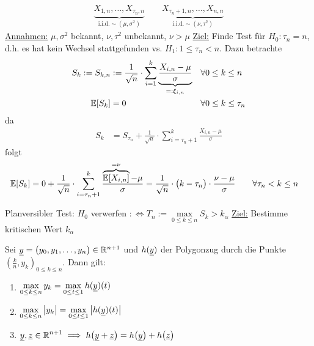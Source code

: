 \begin{align*}
\underbrace{X_{1,n},\ldots,X_{\tau_n,n}}_{\text{i.i.d.}\sim(\mu,\sigma^2)}\qquad\underbrace{X_{\tau_n+1,n},\ldots,X_{n,n}}_{\text{i.i.d.}\sim(\nu,\tau^2)}
\end{align*}
\underline{Annahmen:} $\mu,\sigma^2$ bekannt, $\nu,\tau^2$ unbekannt, $\nu>\mu$\nl
\underline{Ziel:} Finde Test für 
$H_0:\tau_n=n$, d.h. es hat kein Wechsel stattgefunden vs. $H_1:1\leq\tau_n<n$. Dazu betrachte
\begin{align*}
S_k:=S_{k,n}&:=\frac{1}{\sqrt{n}}\cdot\sum\limits_{i=1}^k\underbrace{\frac{X_{i,n}-\mu}{\sigma}}_{=:\xi_{i,n}}&\forall& 0\leq k\leq n\\
\mathbb{E}[S_k]&=0\qquad	&\forall& 0\leq k\leq\tau_n
\end{align*}
da
\begin{align*}
S_k&=S_{\tau_n}+\frac{1}{\sqrt{n}}\cdot\sum\limits_{i=\tau_n+1}^k\frac{X_{i,n}-\mu}{\sigma}
\end{align*}
folgt
\begin{align*}
\mathbb{E}[S_k]
&=0+\frac{1}{\sqrt{n}}\cdot\sum\limits_{i=\tau_n+1}^k\frac{\overbrace{\mathbb{E}[X_{i,n}]}^{=\nu}-\mu}{\sigma}
=\frac{1}{\sqrt{n}}\cdot\big(k-\tau_n\big)\cdot\frac{\nu-\mu}{\sigma}\qquad\forall\tau_n<k\leq n
\end{align*}

Planversibler Test:
$H_0$ verwerfen $:\Longleftrightarrow T_n:=\max\limits_{0\leq k\leq n} S_k>k_\alpha$\nl
\underline{Ziel:} Bestimme kritischen Wert $k_\alpha$

\begin{lemma}\label{lemma7.17}
Sei $\underline{y}=\big(y_0,y_1,\ldots,y_n\big)\in\mathbb{R}^{n+1}$ und $h(\underline{y})$ der Polygonzug durch die Punkte $\left(\frac{k}{n},y_k\right)_{0\leq k\leq n}$. Dann gilt:
\begin{enumerate}[label=(\arabic*)]
\item $\begin{aligned}
\max\limits_{0\leq k\leq n}y_k=\max\limits_{0\leq t\leq 1} h(\underline{y})(t)
\end{aligned}$
\item $\begin{aligned}
\max\limits_{0\leq k\leq n}\big|y_k\big|=\max\limits_{0\leq t\leq 1} \big|h(\underline{y})(t)\big|
\end{aligned}$
\item $\begin{aligned}
\underline{y},\underline{z}\in\mathbb{R}^{n+1}\implies h\big(\underline{y}+\underline{z}\big)=h\big(\underline{y}\big)+h\big(\underline{z}\big)
\end{aligned}$
\end{enumerate}
\end{lemma}

